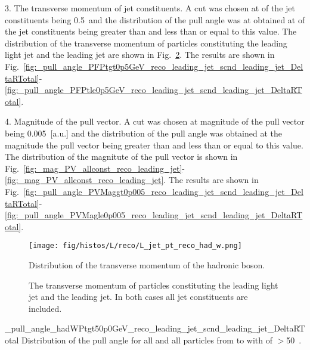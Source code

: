 3. The transverse momentum \pt of jet constituents. A cut was chosen at \pt of the jet constituents being 0.5~\GeV and the distribution of the pull angle was at obtained at \pt of the jet constituents being greater than and less than or equal to this value. The distribution of the transverse momentum of particles constituting the leading light jet and the leading \cPqb jet are shown in Fig.~\ref{fig:L_JetConstPT_allconst_reco}. The results are shown in Fig.~\ref{fig:_pull_angle_PFPtgt0p5GeV_reco_leading_jet_scnd_leading_jet_DeltaRTotal}-\ref{fig:_pull_angle_PFPtle0p5GeV_reco_leading_jet_scnd_leading_jet_DeltaRTotal}.

4. Magnitude of the pull vector. A cut was chosen at magnitude of the pull vector being 0.005~[a.u.] and the distribution of the pull angle was obtained at the magnitude the pull vector being greater than and less than or equal to this value. The distribution of the magnitute of the pull vector is shown in Fig.~\ref{fig:_mag_PV_allconst_reco_leading_jet}-\ref{fig:_mag_PV_allconst_reco_leading_jet}. The results are shown in Fig.~\ref{fig:_pull_angle_PVMaggt0p005_reco_leading_jet_scnd_leading_jet_DeltaRTotal}-\ref{fig:_pull_angle_PVMagle0p005_reco_leading_jet_scnd_leading_jet_DeltaRTotal}.

\begin{figure}
\centering
\texttt{[image: fig/histos/L/reco/L\_jet\_pt\_reco\_had\_w.png]}
\caption{Distribution of the transverse momentum \pt of the hadronic \PW boson.}
\label{fig:L_jet_pt_reco_had_w}
\end{figure}

\begin{figure}[hbtp]
    \centering
        \def\twidth{0.45}
\caption{The transverse momentum \pt of particles constituting the leading light jet and the leading \cPqb jet. In both cases all jet constituents are included.}
\label{fig:L_JetConstPT_allconst_reco}

\end{figure}

     {_pull_angle_hadWPtgt50p0GeV_reco_leading_jet_scnd_leading_jet_DeltaRTotal}
     {Distribution of the pull angle for all \DeltaR and all particles from \leadingjet to \scndleadingjet with \pt of \PW $>$50~\GeV.}

